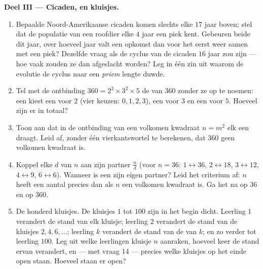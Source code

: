 \begin{problem}
\medskip
\noindent\textbf{Deel III --- Cicaden,  en kluisjes.}
\begin{enumerate}[resume]
  \item Bepaalde Noord-Amerikaanse cicaden komen slechts elke $17$ jaar boven;
        stel dat de populatie van een roofdier elke $4$ jaar een piek kent.
        Gebeuren beide dit jaar, over hoeveel jaar valt een opkomst dan voor het
        eerst weer samen met een piek? Dezelfde vraag als de cyclus van de cicaden
        $16$ jaar zou zijn --- hoe vaak zouden ze dan afgeslacht worden? Leg in één
        zin uit waarom de evolutie de cyclus naar een \emph{priem} lengte duwde.
  \item Tel met de ontbinding $360 = 2^3 \times 3^2 \times 5$ de  van $360$
        zonder ze op te noemen: een  kiest een  voor $2$ (vier
        keuzen: $0, 1, 2, 3$), een voor $3$ en een voor $5$. Hoeveel  zijn er
        in totaal?
  \item Toon aan dat in de ontbinding van een volkomen kwadraat $n = m^2$ elk
         een \emph{}  draagt. Leid af, zonder één
        vierkantswortel te berekenen, dat $360$ geen volkomen kwadraat is.
  \item Koppel elke  $d$ van $n$ aan zijn partner $\frac{n}{d}$ (voor
        $n = 36$: $1 \leftrightarrow 36$, $2 \leftrightarrow 18$,
        $3 \leftrightarrow 12$, $4 \leftrightarrow 9$, $6 \leftrightarrow 6$).
        Wanneer is een  zijn eigen partner? Leid het criterium af: $n$ heeft
        een \emph{} aantal  precies dan als $n$ een volkomen kwadraat
        is. Ga het na op $36$ en op $360$.
  \item De honderd kluisjes. De kluisjes $1$ tot $100$ zijn in het begin dicht.
        Leerling $1$ verandert de stand van elk kluisje; leerling $2$ verandert de
        stand van de kluisjes $2, 4, 6, \dots$; leerling $k$ verandert de stand van
        de  van $k$; en zo verder tot leerling $100$. Leg uit welke
        leerlingen kluisje $n$ aanraken, hoeveel keer de stand ervan verandert, en
        --- met vraag 14 --- precies welke kluisjes op het einde open staan.
        Hoeveel staan er open?
\end{enumerate}
\end{problem}
